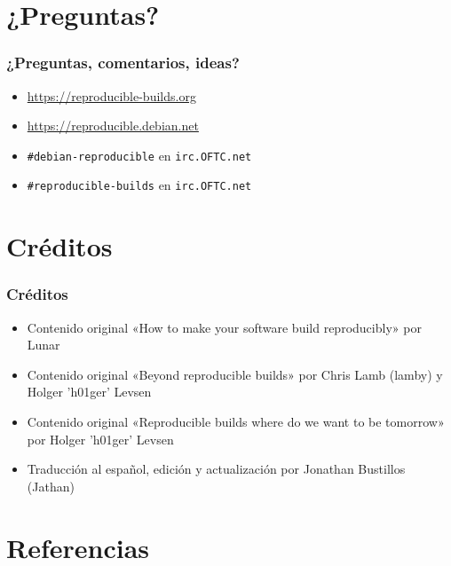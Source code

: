 \documentclass[14pt,aspectratio=169]{beamer}
\begin{document}
\section{¿Preguntas?}

\begin{frame}
 \frametitle{¿Preguntas, comentarios, ideas?}

 \begin{itemize}
  \item \url{https://reproducible-builds.org}
  \item \url{https://reproducible.debian.net}
  \item \texttt{\#debian-reproducible} en \texttt{irc.OFTC.net}
  \item \texttt{\#reproducible-builds} en \texttt{irc.OFTC.net}
 \end{itemize}
\end{frame}

\section{Créditos}

\begin{frame}
 \frametitle{Créditos}

 \begin{itemize}
  \item Contenido original «How to make your software build reproducibly» por Lunar
  \item Contenido original «Beyond reproducible builds» por Chris Lamb (lamby) y Holger ’h01ger’ Levsen
  \item Contenido original «Reproducible builds where do we want to be tomorrow» por Holger ’h01ger’ Levsen
  \item Traducción al español, edición y actualización por Jonathan Bustillos (Jathan)
 \end{itemize}
\end{frame}

\section{Referencias}
\end{document}
